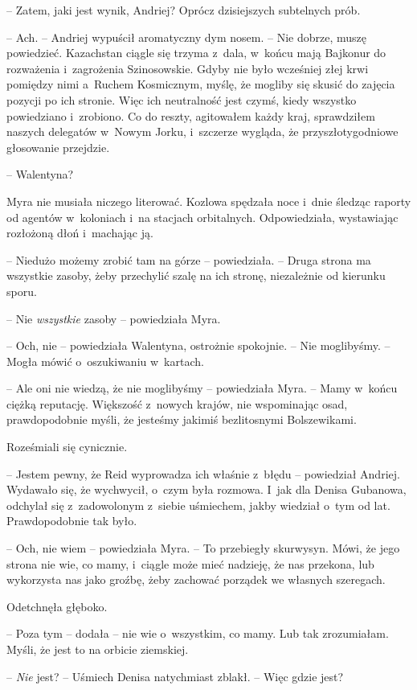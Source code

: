 \documentclass[oneside,polish,11pt,sfheadings]{mwbk}
\begin{document}
-- Zatem, jaki jest wynik, Andriej? Oprócz dzisiejszych subtelnych prób.

-- Ach. -- Andriej wypuścił aromatyczny dym nosem. -- Nie dobrze, muszę
powiedzieć. Kazachstan ciągle się trzyma z~dala, w~końcu mają Bajkonur
do rozważenia i~zagrożenia Szinosowskie. Gdyby nie było wcześniej złej
krwi pomiędzy nimi a~Ruchem Kosmicznym, myślę, że mogliby się skusić do
zajęcia pozycji po ich stronie. Więc ich neutralność jest czymś, kiedy
wszystko powiedziano i~zrobiono. Co do reszty, agitowałem każdy kraj,
sprawdziłem naszych delegatów w~Nowym Jorku, i~szczerze wygląda, że
przyszłotygodniowe głosowanie przejdzie.

-- Walentyna?

Myra nie musiała niczego literować. Kozlowa spędzała noce i~dnie śledząc
raporty od agentów w~koloniach i~na stacjach orbitalnych. Odpowiedziała,
wystawiając rozłożoną dłoń i~machając ją.

-- Niedużo możemy zrobić tam na górze -- powiedziała. -- Druga strona ma
wszystkie zasoby, żeby przechylić szalę na ich stronę, niezależnie od
kierunku sporu.

-- Nie \textit{wszystkie} zasoby -- powiedziała Myra.

-- Och, nie -- powiedziała Walentyna, ostrożnie spokojnie. -- Nie
moglibyśmy. -- Mogła mówić o~oszukiwaniu w~kartach.

-- Ale oni nie wiedzą, że nie moglibyśmy -- powiedziała Myra. -- Mamy w~końcu ciężką reputację. Większość z~nowych krajów, nie wspominając osad,
prawdopodobnie myśli, że jesteśmy jakimiś bezlitosnymi Bolszewikami.

Roześmiali się cynicznie.

-- Jestem pewny, że Reid wyprowadza ich właśnie z~błędu -- powiedział
Andriej. Wydawało się, że wychwycił, o~czym była rozmowa. I~jak dla
Denisa Gubanowa, odchylał się z~zadowolonym z~siebie uśmiechem, jakby
wiedział o~tym od lat. Prawdopodobnie tak było.

-- Och, nie wiem -- powiedziała Myra. -- To przebiegły skurwysyn. Mówi, że
jego strona nie wie, co mamy, i~ciągle może mieć nadzieję, że nas
przekona, lub wykorzysta nas jako groźbę, żeby zachować porządek we
własnych szeregach.

Odetchnęła głęboko.

-- Poza tym -- dodała -- nie wie o~wszystkim, co mamy. Lub tak zrozumiałam.
Myśli, że jest to na orbicie ziemskiej.

-- \textit{Nie} jest? -- Uśmiech Denisa natychmiast zblakł. -- Więc gdzie
jest?
\end{document}
